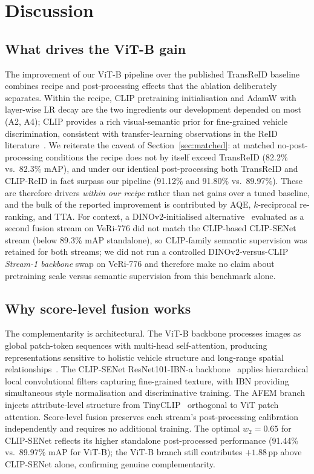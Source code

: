 \documentclass[10pt,a4paper]{article}
\begin{document}
\section{Discussion}
\label{sec:discussion}

\subsection{What drives the ViT-B gain}
The improvement of our ViT-B pipeline over the published TransReID baseline
combines recipe and post-processing effects that the ablation deliberately
separates. Within the recipe, CLIP pretraining initialisation and AdamW with
layer-wise LR decay are the two ingredients our development depended on most
(A2, A4); CLIP provides a rich visual-semantic prior for fine-grained vehicle
discrimination, consistent with transfer-learning observations in the ReID
literature~\cite{li2023clipreid,radford2021clip}. We reiterate the caveat of
Section~\ref{sec:matched}: at matched no-post-processing conditions the recipe
does not by itself exceed TransReID (82.2\% vs.\ 82.3\% mAP), and under our
identical post-processing both TransReID and CLIP-ReID in fact surpass our
pipeline (91.12\% and 91.80\% vs.\ 89.97\%). These are therefore drivers
\emph{within our recipe} rather than net gains over a tuned baseline, and the
bulk of the reported improvement is contributed by AQE, $k$-reciprocal
re-ranking, and TTA. For context, a DINOv2-initialised
alternative~\cite{oquab2023dinov2} evaluated as a second fusion stream on
VeRi-776 did not match the CLIP-based CLIP-SENet stream (below 89.3\% mAP
standalone), so CLIP-family semantic supervision was retained for both streams;
we did not run a controlled DINOv2-versus-CLIP \emph{Stream-1 backbone} swap on
VeRi-776 and therefore make no claim about pretraining scale versus semantic
supervision from this benchmark alone.

\subsection{Why score-level fusion works}
The complementarity is architectural. The ViT-B backbone processes images as
global patch-token sequences with multi-head self-attention, producing
representations sensitive to holistic vehicle structure and long-range spatial
relationships~\cite{he2021transreid,dosovitskiy2021vit}. The CLIP-SENet
ResNet101-IBN-a backbone~\cite{pan2018ibn} applies hierarchical local
convolutional filters capturing fine-grained texture, with IBN providing
simultaneous style normalisation and discriminative training. The AFEM branch
injects attribute-level structure from TinyCLIP~\cite{lu2025clipsenet}
orthogonal to ViT patch attention. Score-level fusion preserves each stream's
post-processing calibration independently and requires no additional training.
The optimal $w_2{=}0.65$ for CLIP-SENet reflects its higher standalone
post-processed performance (91.44\% vs.\ 89.97\% mAP for ViT-B); the ViT-B
branch still contributes $+1.88$\,pp above CLIP-SENet alone, confirming genuine
complementarity.
\end{document}
